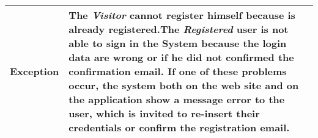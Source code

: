 \begin{table}[H]
\begin{tabular}{|p{3.5cm}|p{10.3cm}|}
    \hline
    \textbf{\large{Exception}} 			& The \emph{Visitor} cannot register himself because is already registered.\newline The \emph{Registered} user                                         is not able to sign in the System because the login data are wrong or if he did not confirmed  the confirmation email. \newline
    										If one of these problems occur, the system both on the web site and on the application show a message error to the user, which is invited to re-insert their credentials or confirm the registration email.\\
    
    \hline
    
    
    \end{tabular}
	
\end{table}

